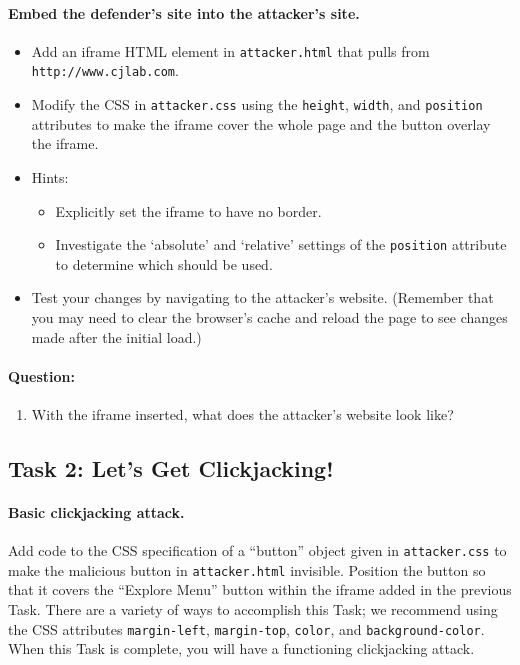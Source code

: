 \paragraph{Embed the defender's site into the attacker's site.}
\begin{itemize}
    \item Add an iframe HTML element in \texttt{attacker.html} that 
    pulls from \texttt{http://www.cjlab.com}. 
    \item Modify the CSS in \texttt{attacker.css} using the 
    \texttt{height}, \texttt{width}, and \texttt{position} attributes 
    to make the iframe cover the whole page and the button overlay the
    iframe.
    
    \item Hints:
    \begin{itemize}
       \item Explicitly set the iframe to have no border.
       \item Investigate the `absolute' and `relative' settings of the 
       \texttt{position} attribute to determine which should be used.
    \end{itemize} 

    \item Test your changes by navigating to the attacker's website.
          (Remember that you may need to clear the browser's cache and
          reload the page to see changes made after the initial load.)

\end{itemize} 

\paragraph{Question:}
\begin{enumerate}
    \item With the iframe inserted, what does the attacker's website
    look like?
\end{enumerate}


\subsection{Task 2: Let's Get Clickjacking!}

\paragraph{Basic clickjacking attack.}
Add code to the CSS specification of a ``button'' object given in
\texttt{attacker.css} to make the malicious button in
\texttt{attacker.html} invisible. Position the button so that it
covers the ``Explore Menu'' button within the iframe added in the
previous Task. There are a variety of ways to accomplish this Task; we
recommend using the CSS attributes \texttt{margin-left}, 
\texttt{margin-top}, \texttt{color}, and \texttt{background-color}. When
this Task is complete, you will have a functioning clickjacking attack. 

